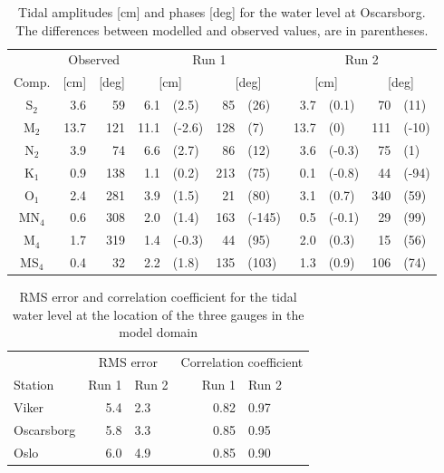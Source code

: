 \begin{table}[ht]
\caption{Tidal amplitudes [cm] and phases [deg] for the water level at Oscarsborg. The differences between modelled and observed values, are in parentheses.}
\label{tab:Oscarsborg}
\centering
\begin{tabular}{crrr@{ }lr@{ }lr@{ }lr@{ }l} \hline
      & \multicolumn{2}{c}{Observed} & \multicolumn{4}{c}{Run 1} & \multicolumn{4}{c}{Run 2}  \\
Comp. &  [cm] & [deg] & \multicolumn{2}{c}{[cm]} & \multicolumn{2}{c}{[deg]} & \multicolumn{2}{c}{[cm]} & \multicolumn{2}{c}{[deg]} \\ \hline 
S$_2$  &   3.6 &  59  &   6.1 & (2.5)  &  85 & (26)   &  3.7 & (0.1)  &  70 & (11)  \\
M$_2$  &  13.7 & 121  &  11.1 & (-2.6) & 128 & (7)    & 13.7 & (0)    & 111 & (-10) \\
N$_2$  &   3.9 &  74  &   6.6 & (2.7)  &  86 & (12)   &  3.6 & (-0.3) &  75 & (1)   \\
K$_1$  &   0.9 & 138  &   1.1 & (0.2)  & 213 & (75)   &  0.1 & (-0.8) &  44 & (-94) \\
O$_1$  &   2.4 & 281  &   3.9 & (1.5)  &  21 & (80)   &  3.1 & (0.7)  & 340 & (59)  \\
MN$_4$ &   0.6 & 308  &   2.0 & (1.4)  & 163 & (-145) &  0.5 & (-0.1) &  29 & (99)  \\
M$_4$  &   1.7 & 319  &   1.4 & (-0.3) &  44 & (95)   &  2.0 & (0.3)  &  15 & (56)  \\
MS$_4$ &   0.4 &  32  &   2.2 & (1.8)  & 135 & (103)  &  1.3 & (0.9)  & 106 & (74)  \\ \hline 
\end{tabular}
\end{table}

\begin{table}[ht]
\caption{RMS error and correlation coefficient for the tidal water level at the location of the three gauges in the model domain}
\label{tab:RMS}
\centering
\begin{tabular}{lrlrl} \hline
 & \multicolumn{2}{c}{RMS error} & \multicolumn{2}{c}{Correlation coefficient} \\ 
Station & Run 1 & Run 2 & \hspace{0.5cm} Run 1 & Run 2 \\ \hline 
Viker      & 5.4 &   2.3 &  0.82  &  0.97 \\
Oscarsborg & 5.8 &   3.3 &  0.85  &  0.95 \\
Oslo       & 6.0 &   4.9 &  0.85  &  0.90 \\ \hline
\end{tabular}
\end{table}

